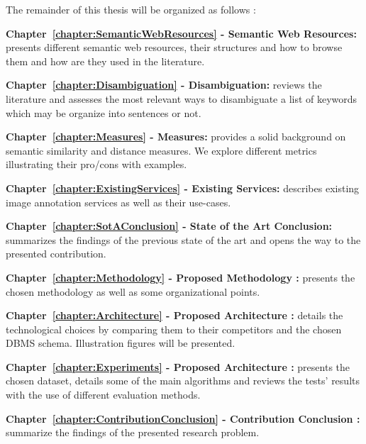The remainder of this thesis will be organized as follows :
\begin{description}
\item\textbf{Chapter~\ref{chapter:SemanticWebResources} - Semantic Web Resources:} presents different semantic web resources, their structures and how to browse them and how are they used in the literature. 
\item\textbf{Chapter~\ref{chapter:Disambiguation} - Disambiguation:} reviews the literature and assesses the most relevant ways to disambiguate a list of keywords which may be organize into sentences or not. 
\item\textbf{Chapter~\ref{chapter:Measures} - Measures:} provides a solid background on semantic similarity and distance measures. We explore different metrics illustrating their pro/cons with examples.
\item\textbf{Chapter~\ref{chapter:ExistingServices} - Existing Services:} describes existing image annotation services as well as their use-cases.
\item\textbf{Chapter~\ref{chapter:SotAConclusion} - State of the Art Conclusion:} summarizes the findings of the previous state of the art and opens the way to the presented contribution.
\item\textbf{Chapter~\ref{chapter:Methodology} - Proposed Methodology :} presents the chosen methodology as well as some organizational points.
\item\textbf{Chapter~\ref{chapter:Architecture} - Proposed Architecture :} details the technological choices by comparing them to their competitors and the chosen DBMS schema. Illustration figures will be presented.
\item\textbf{Chapter~\ref{chapter:Experiments} - Proposed Architecture :} presents the chosen dataset, details some of the main algorithms and reviews the tests' results with the use of different evaluation methods.
\item\textbf{Chapter~\ref{chapter:ContributionConclusion} - Contribution Conclusion :} summarize the findings of the presented research problem.
\end{description}